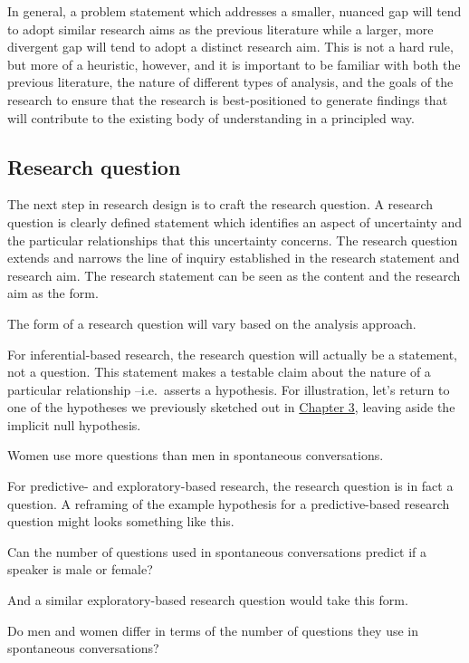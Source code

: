 \documentclass[
  letterpaper,
]{latex/krantz}
\begin{document}
In general, a problem statement which addresses a smaller, nuanced gap
will tend to adopt similar research aims as the previous literature
while a larger, more divergent gap will tend to adopt a distinct
research aim. This is not a hard rule, but more of a heuristic, however,
and it is important to be familiar with both the previous literature,
the nature of different types of analysis, and the goals of the research
to ensure that the research is best-positioned to generate findings that
will contribute to the existing body of understanding in a principled
way.

\hypertarget{research-question}{%
\subsection{Research question}\label{research-question}}

The next step in research design is to craft the research question. A
research question is clearly defined statement
which identifies an aspect of uncertainty and the particular
relationships that this uncertainty concerns. The research question
extends and narrows the line of inquiry established in the research
statement and research aim. The research statement can be seen as the
content and the research aim as the form.

The form of a research question will vary based on the analysis
approach.

For inferential-based research, the research question will actually be a
statement, not a question. This statement makes a testable claim about
the nature of a particular relationship --i.e.~asserts a hypothesis. For
illustration, let's return to one of the hypotheses we previously
sketched out in \protect\hyperlink{sec-approaching-analysis}{Chapter 3},
leaving aside the implicit null hypothesis.

Women use more questions than men in spontaneous conversations.

For predictive- and exploratory-based research, the research question is
in fact a question. A reframing of the example hypothesis for a
predictive-based research question might looks something like this.

Can the number of questions used in spontaneous conversations predict if
a speaker is male or female?

And a similar exploratory-based research question would take this form.

Do men and women differ in terms of the number of questions they use in
spontaneous conversations?
\end{document}
